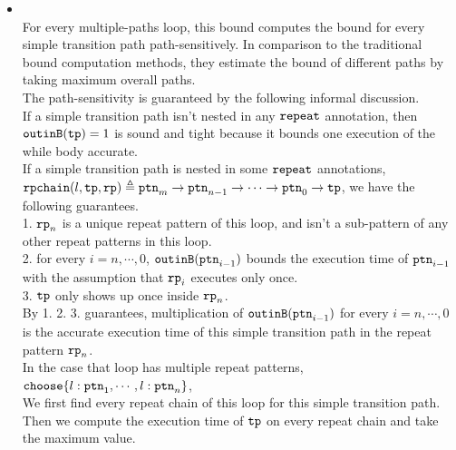 \begin{enumerate}
\begin{itemize}
  \item
  \\
  For every multiple-paths loop,
  this bound computes the bound for every simple transition path path-sensitively.
  In comparison to the traditional bound computation methods, they
  estimate the bound of different paths by taking maximum overall paths.
  \\
  The path-sensitivity is guaranteed by the following informal discussion.
  \\
  If a simple transition path isn't nested in any $\mathtt{repeat}$ annotation, then
  $\mathtt{outinB}(\mathtt{tp}) = 1$ is sound and tight because it bounds one execution of the while body accurate.
  \\
  If a simple transition path is nested in some $\mathtt{repeat}$ annotations,
  $\mathtt{rpchain}(l, \mathtt{tp}, \mathtt{rp}) \triangleq \mathtt{ptn}_m \to \mathtt{ptn}_{n-1} \to \cdots \to \mathtt{ptn}_{0} \to \mathtt{tp}$, we have the following guarantees.
  \\
  1. $\mathtt{rp}_n$ is a unique repeat pattern of this loop,
  and isn't a sub-pattern of any other repeat patterns in this loop.
  \\
  2. for every $i = n, \cdots, 0$, $\mathtt{outinB}(\mathtt{ptn}_{i - 1})$ bounds the execution time of $\mathtt{ptn}_{i - 1}$ with the assumption that $\mathtt{rp}_{i}$ executes only once.
  \\
  3. $\mathtt{tp}$ only shows up once inside $\mathtt{rp}_n$.
  \\
  By 1. 2. 3. guarantees, multiplication of $\mathtt{outinB}(\mathtt{ptn}_{i - 1})$ for every $i = n, \cdots, 0$ is the accurate execution time of this
  simple transition path in the repeat pattern $\mathtt{rp}_n$.
  \\
  In the case that loop has multiple repeat patterns, $\rpchoose{l: \rpattern_1, \cdots, l: \rpattern_n}$,
  \\
  We first find every repeat chain of this loop for this simple transition path.
  Then we compute the execution time of $\mathtt{tp}$ on every repeat chain and take the maximum value.
%  
  \end{itemize}

\end{enumerate}
